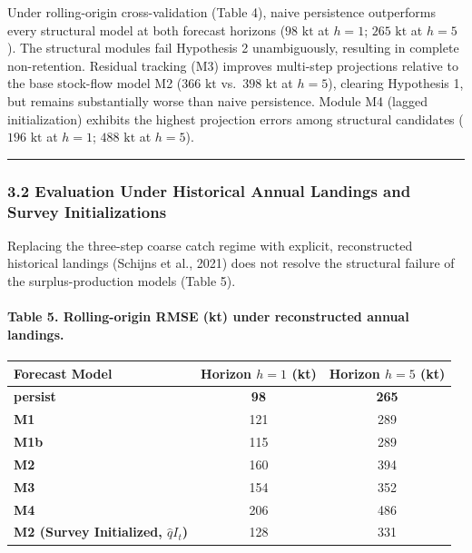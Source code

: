 \documentclass[11pt]{article}
\begin{document}
Under rolling-origin cross-validation (Table 4), naive persistence
outperforms every structural model at both forecast horizons
(\(98\text{ kt}\) at \(h=1\); \(265\text{ kt}\) at \(h=5\)). The
structural modules fail Hypothesis 2 unambiguously, resulting in
complete non-retention. Residual tracking (M3) improves multi-step
projections relative to the base stock-flow model M2 (\(366\text{ kt}\)
vs.~\(398\text{ kt}\) at \(h=5\)), clearing Hypothesis 1, but remains
substantially worse than naive persistence. Module M4 (lagged
initialization) exhibits the highest projection errors among structural
candidates (\(196\text{ kt}\) at \(h=1\); \(488\text{ kt}\) at \(h=5\)).

\begin{center}\rule{0.5\linewidth}{0.5pt}\end{center}

\subsubsection{3.2 Evaluation Under Historical Annual Landings and
Survey
Initializations}\label{evaluation-under-historical-annual-landings-and-survey-initializations}

Replacing the three-step coarse catch regime with explicit,
reconstructed historical landings (Schijns et al., 2021) does not
resolve the structural failure of the surplus-production models (Table
5).

\paragraph{Table 5. Rolling-origin RMSE (kt) under reconstructed annual
landings.}\label{table-5.-rolling-origin-rmse-kt-under-reconstructed-annual-landings.}

{\def\LTcaptype{none} %
\begin{longtable}[]{@{}lcc@{}}
\toprule\noalign{}
Forecast Model & Horizon \(h=1\) (kt) & Horizon \(h=5\) (kt) \\
\midrule\noalign{}
\endhead
\bottomrule\noalign{}
\endlastfoot
\textbf{persist} & \textbf{98} & \textbf{265} \\
\textbf{M1} & 121 & 289 \\
\textbf{M1b} & 115 & 289 \\
\textbf{M2} & 160 & 394 \\
\textbf{M3} & 154 & 352 \\
\textbf{M4} & 206 & 486 \\
\textbf{M2 (Survey Initialized, \(\hat{q} I_t\))} & 128 & 331 \\
\end{longtable}
}
\end{document}
